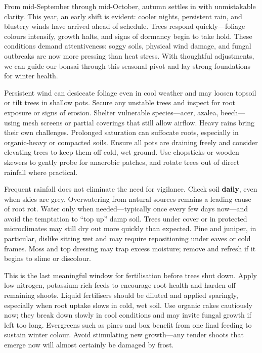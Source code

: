 \label{2025-09-care}
\noindent  
From mid\--September through mid\--October, autumn settles in with unmistakable clarity.  
This year, an early shift is evident: cooler nights, persistent rain, and blustery winds have arrived ahead of schedule.  
Trees respond quickly---foliage colours intensify, growth halts, and signs of dormancy begin to take hold.  
These conditions demand attentiveness: soggy soils, physical wind damage, and fungal outbreaks are now more pressing than heat stress.  
With thoughtful adjustments, we can guide our bonsai through this seasonal pivot and lay strong foundations for winter health.

\medskip  
{}  
\noindent  
Persistent wind can desiccate foliage even in cool weather and may loosen topsoil or tilt trees in shallow pots.  
Secure any unstable trees and inspect for root exposure or signs of erosion.  
Shelter vulnerable species---acer, azalea, beech---using mesh screens or partial coverings that still allow airflow.  
%
Heavy rains bring their own challenges. Prolonged saturation can suffocate roots, especially in organic\--heavy or compacted soils.  
Ensure all pots are draining freely and consider elevating trees to keep them off cold, wet ground.  
Use chopsticks or wooden skewers to gently probe for anaerobic patches, and rotate trees out of direct rainfall where practical.  

\medskip  
{}  
\noindent  
Frequent rainfall does not eliminate the need for vigilance.  
Check soil \textbf{daily}, even when skies are grey. Overwatering from natural sources remains a leading cause of root rot.  
Water only when needed---typically once every few days now---and avoid the temptation to “top up” damp soil.  
%
Trees under cover or in protected microclimates may still dry out more quickly than expected.  
Pine and juniper, in particular, dislike sitting wet and may require repositioning under eaves or cold frames.  
Moss and top dressing may trap excess moisture; remove and refresh if it begins to slime or discolour.  

\medskip  
{}  
\noindent  
This is the last meaningful window for fertilisation before trees shut down.  
Apply low\--nitrogen, potassium\--rich feeds to encourage root health and harden off remaining shoots.  
Liquid fertilisers should be diluted and applied sparingly, especially when root uptake slows in cold, wet soil.  
%
Use organic cakes cautiously now; they break down slowly in cool conditions and may invite fungal growth if left too long.  
Evergreens such as pines and box benefit from one final feeding to sustain winter colour.  
Avoid stimulating new growth---any tender shoots that emerge now will almost certainly be damaged by frost.  

